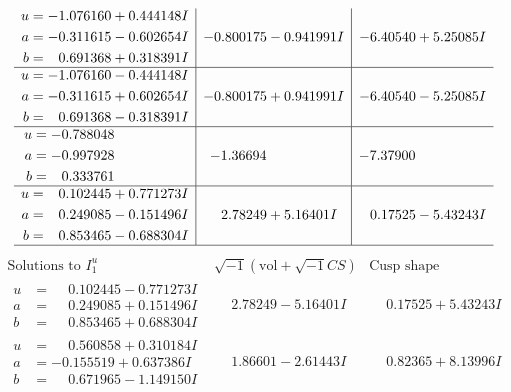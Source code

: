 \documentclass[1p]{elsarticle_modified}
\theoremstyle{definition}
\newcommand{\I}{\sqrt{-1}}
\begin{document}
$$\begin{array}{c|c|c}
\begin{aligned}
u &= -1.076160 + 0.444148 I \\
a &= -0.311615 - 0.602654 I \\
b &= \phantom{-}0.691368 + 0.318391 I\end{aligned}
 & -0.800175 - 0.941991 I & -6.40540 + 5.25085 I \\ \hline\begin{aligned}
u &= -1.076160 - 0.444148 I \\
a &= -0.311615 + 0.602654 I \\
b &= \phantom{-}0.691368 - 0.318391 I\end{aligned}
 & -0.800175 + 0.941991 I & -6.40540 - 5.25085 I \\ \hline\begin{aligned}
u &= -0.788048\phantom{ +0.000000I} \\
a &= -0.997928\phantom{ +0.000000I} \\
b &= \phantom{-}0.333761\phantom{ +0.000000I}\end{aligned}
 & -1.36694\phantom{ +0.000000I} & -7.37900\phantom{ +0.000000I} \\ \hline\begin{aligned}
u &= \phantom{-}0.102445 + 0.771273 I \\
a &= \phantom{-}0.249085 - 0.151496 I \\
b &= \phantom{-}0.853465 - 0.688304 I\end{aligned}
 & \phantom{-}2.78249 + 5.16401 I & \phantom{-}0.17525 - 5.43243 I\\
 \hline 
 \end{array}$$\newpage$$\begin{array}{c|c|c}  
\text{Solutions to }I^u_{1}& \I (\text{vol} + \sqrt{-1}CS) & \text{Cusp shape}\\
 \hline 
\begin{aligned}
u &= \phantom{-}0.102445 - 0.771273 I \\
a &= \phantom{-}0.249085 + 0.151496 I \\
b &= \phantom{-}0.853465 + 0.688304 I\end{aligned}
 & \phantom{-}2.78249 - 5.16401 I & \phantom{-}0.17525 + 5.43243 I \\ \hline\begin{aligned}
u &= \phantom{-}0.560858 + 0.310184 I \\
a &= -0.155519 + 0.637386 I \\
b &= \phantom{-}0.671965 - 1.149150 I\end{aligned}
 & \phantom{-}1.86601 - 2.61443 I & \phantom{-}0.82365 + 8.13996 I \\ \hline\begin{aligned}

\end{aligned}
\end{array}$$
\end{document}

